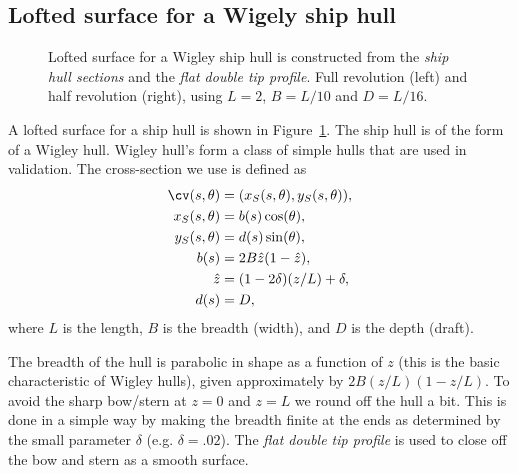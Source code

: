 \subsection{Lofted surface for a Wigely ship hull}

{
\newcommand{\figWidth}{8cm}
\newcommand{\trimfig}[2]{\trimPlot{#1}{#2}{.0}{.0}{.15}{.15}}
\begin{figure}[hbt]
\begin{center}
\end{center}
\caption{Lofted surface for a Wigley ship hull is constructed from the {\em ship hull sections} and the {\em flat double tip profile}. 
    Full revolution (left) and half revolution (right), using $L=2$, $B=L/10$ and $D=L/16$.}
\label{fig:loftedShipHull}
\end{figure}
}


A lofted surface for a ship hull is shown in Figure~\ref{fig:loftedShipHull}.
The ship hull is of the form of a Wigley hull. Wigley hull's form a class of
simple hulls that are used in validation.
The cross-section we use is defined as
 \begin{align*}
  \cv(s,\theta) &= (x_S(s,\theta),y_S(s,\theta)), \\
  x_S(s,\theta) &= b(s) \cos(\theta), \\
  y_S(s,\theta) &= d(s) \sin(\theta),  \\
  b(s) &=   2 B \hat{z} (1- \hat{z}) , \\
  \hat{z} &= (1-2\delta) (z/ L) + \delta, \\
  d(s) &= D ,
\end{align*}
where $L$ is the length, $B$ is the breadth (width), and $D$ is the depth (draft).


The breadth of the hull is parabolic in shape 
as a function of $z$ (this is the basic characteristic of Wigley hulls), given approximately by $ 2 B (z/L)(1-z/L)$.
To avoid the sharp bow/stern at $z=0$ and $z=L$ we round off the hull a bit. This is done in a simple way by making
the breadth finite at the ends as determined by the small parameter $\delta$ (e.g. $\delta=.02$). 
The {\em flat double tip profile} is used to close off the bow and stern as a smooth surface.

